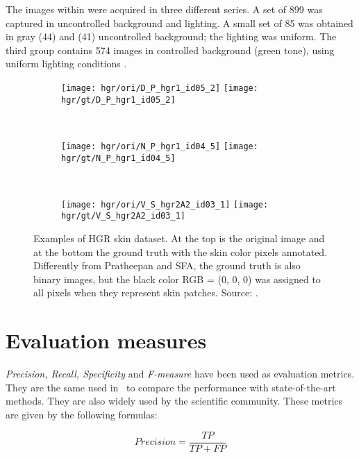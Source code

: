 The images within were acquired in three different series. A set of 899 was captured in uncontrolled background and lighting. A small set of 85 was obtained in gray (44) and (41) uncontrolled background; the lighting was uniform. The third group contains 574 images in controlled background (green tone), using uniform lighting conditions \citep{kawulok:14, nalepa:14, grzejszczak:16}.

\begin{figure}[hb]
    \centering
    \begin{subfigure}[t]{0.3\textwidth}
        \texttt{[image: hgr/ori/D\_P\_hgr1\_id05\_2]}
        \texttt{[image: hgr/gt/D\_P\_hgr1\_id05\_2]}
    \end{subfigure}
    ~
    \begin{subfigure}[t]{0.275\textwidth}
        \texttt{[image: hgr/ori/N\_P\_hgr1\_id04\_5]}
        \texttt{[image: hgr/gt/N\_P\_hgr1\_id04\_5]}
    \end{subfigure}
    ~
    \begin{subfigure}[t]{0.337\textwidth}
        \texttt{[image: hgr/ori/V\_S\_hgr2A2\_id03\_1]}
        \texttt{[image: hgr/gt/V\_S\_hgr2A2\_id03\_1]}
    \end{subfigure}
    \caption[Examples of HGR skin dataset]{Examples of HGR skin dataset. At the top is the original image and at the bottom the ground truth with the skin color pixels annotated. Differently from Pratheepan and SFA, the ground truth is also binary images, but the black color RGB = (0, 0, 0) was assigned to all pixels when they represent skin patches. Source: \citet{kawulok:14, nalepa:14, grzejszczak:16}.}
    \label{fig:hgr_dataset_exemplo}
\end{figure}



\section{Evaluation measures}

\textit{Precision, Recall, Specificity} and \textit{F-measure} have been used as evaluation metrics. They are the same used in~\citet{brancati:17} to compare the performance with state-of-the-art methods. They are also widely used by the scientific community. These metrics are given by the following formulas:

\begin{equation*}
    Precision = \frac{TP}{TP + FP}
    \label{eq:precision}
\end{equation*}

